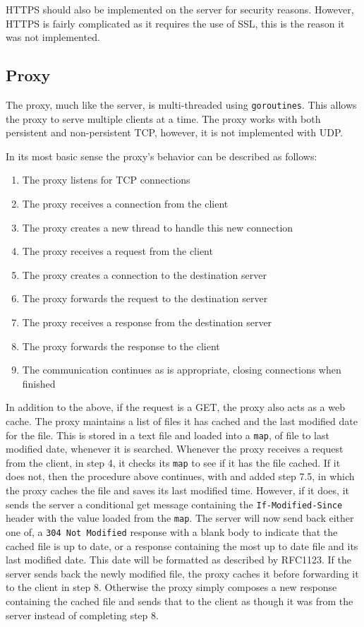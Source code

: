 \documentclass[10pt,twocolumn]{witseiepaper}
\begin{document}
	HTTPS should also be implemented on the server for security reasons. However, HTTPS is fairly complicated as it requires the use of SSL, this is the reason it was not implemented. 

	\subsection{Proxy}

	The proxy, much like the server, is multi-threaded using \texttt{goroutines}. This allows the proxy to serve multiple clients at a time. The proxy works with both persistent and non-persistent TCP, however, it is not implemented with UDP. 

	In its most basic sense the proxy's behavior can be described as follows:

	\begin{enumerate}
		\item The proxy listens for TCP connections
		\item The proxy receives a connection from the client
		\item The proxy creates a new thread to handle this new connection
		\item The proxy receives a request from the client
		\item The proxy creates a connection to the destination server
		\item The proxy forwards the request to the destination server
		\item The proxy receives a response from the destination server
		\item The proxy forwards the response to the client
		\item The communication continues as is appropriate, closing connections when finished 
	\end{enumerate}

	In addition to the above, if the request is a GET, the proxy also acts as a web cache. The proxy maintains a list of files it has cached and the last modified date for the file. This is stored in a text file and loaded into a \texttt{map}, of file to last modified date, whenever it is searched. Whenever the proxy receives a request from the client, in step 4, it checks its \texttt{map} to see if it has the file cached. If it does not, then the procedure above continues, with and added step 7.5, in which the proxy caches the file and saves its last modified time. However, if it does, it sends the server a conditional get message containing the \texttt{If-Modified-Since} header with the value loaded from the \texttt{map}. The server will now send back either one of, a \texttt{304 Not Modified} response with a blank body to indicate that the cached file is up to date, or a response containing the most up to date file and its last modified date. This date will be formatted as described by RFC1123. If the server sends back the newly modified file, the proxy caches it before forwarding it to the client in step 8. Otherwise the proxy simply composes a new response containing the cached file and sends that to the client as though it was from the server instead of completing step 8.
\end{document}
